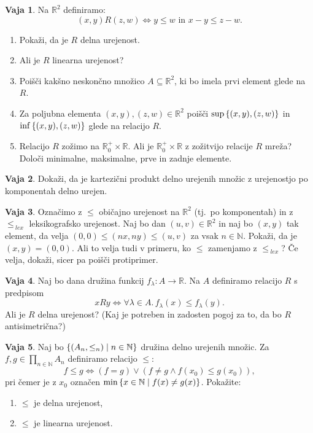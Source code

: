 \documentclass{article}
\newcommand{\all}[1]{\forall #1 .\,}
\newcommand{\NN}{\mathbb{N}}
\newcommand{\RR}{\mathbb{R}}
\theoremstyle{definition}
\newtheorem{vaja}{Vaja}
\begin{document}
\begin{vaja}
  Na $\RR^2$ definiramo:
  \[(x,y) R (z,w) \iff y \leq w \text{ in } x - y \leq z - w.\]
  \begin{enumerate}
    \item
      Pokaži, da je $R$ delna urejenost.
    \item
      Ali je $R$ linearna urejenost?
    \item
      Poišči kakšno neskončno množico $A \subseteq \RR^2$, ki bo imela prvi element glede na $R$.
    \item
      Za poljubna elementa $(x,y), (z,w) \in \RR^2$ poišči $\sup\set{(x,y), (z,w)}$ in $\inf\set{(x,y), (z,w)}$ glede na relacijo $R$.
    \item
      Relacijo $R$ zožimo na $\RR_0^+ \times \RR$. Ali je $\RR_0^+ \times \RR$ z zožitvijo relacije $R$ mreža? Določi minimalne, maksimalne, prve in zadnje elemente.
  \end{enumerate}
\end{vaja}

\begin{vaja}
  Dokaži, da je kartezični produkt delno urejenih množic z urejenostjo po komponentah delno urejen.
\end{vaja}

\begin{vaja}
  Označimo z $\leq$ običajno urejenost na $\RR^2$ (tj.~po komponentah) in z $\leq_{\:lex}$ leksikografsko urejenost. Naj bo dan $(u,v) \in \RR^2$ in naj bo $(x,y)$ tak element, da velja $(0,0) \leq (nx,ny) \leq (u,v)$ za vsak $n \in \NN$. Pokaži, da je $(x,y) = (0,0)$. Ali to velja tudi v primeru, ko $\leq$ zamenjamo z $\leq_{\:lex}$? Če velja, dokaži, sicer pa poišči protiprimer.
\end{vaja}

\begin{vaja}
  Naj bo dana družina funkcij $f_\lambda\colon A \to \RR$. Na $A$ definiramo relacijo $R$ s predpisom
  \[x R y \iff \all{\lambda \in A}{f_\lambda(x) \leq f_\lambda(y)}.\]
  Ali je $R$ delna urejenost? (Kaj je potreben in zadosten pogoj za to, da bo $R$ antisimetrična?)
\end{vaja}

\begin{vaja}
  Naj bo $\set{(A_n, \leq_n)}{n \in \NN}$ družina delno urejenih množic. Za $\displaystyle f, g \in \prod_{n \in \NN} A_n$ definiramo relacijo $\leq$:
  \[f \leq g \iff (f = g) \lor (f \neq g \land f(x_0) \leq g(x_0)),\]
  pri čemer je z $x_0$ označen $\min\set{x \in \NN}{f(x) \neq g(x)}$. Pokažite:
  \begin{enumerate}
    \item $\leq$ je delna urejenost,
    \item $\leq$ je linearna urejenost.
  \end{enumerate}
\end{vaja}
\end{document}

